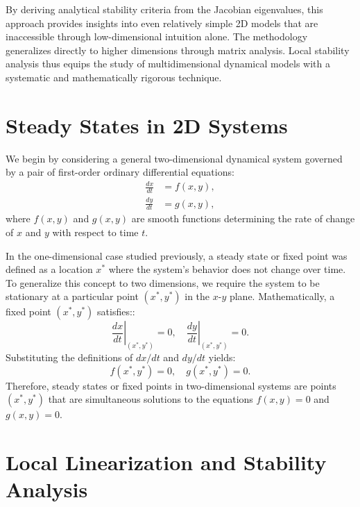 By deriving analytical stability criteria from the Jacobian eigenvalues, this approach provides insights into even relatively simple 2D models that are inaccessible through low-dimensional intuition alone. The methodology generalizes directly to higher dimensions through matrix analysis. Local stability analysis thus equips the study of multidimensional dynamical models with a systematic and mathematically rigorous technique.

\section{Steady States in 2D Systems}

We begin by considering a general two-dimensional dynamical system governed by a pair of first-order ordinary differential equations:
\begin{align}
\frac{dx}{dt} &= f(x,y), \label{eq:11.01}\\
\frac{dy}{dt} &= g(x,y), \label{eq:11.02}
\end{align}
where $f(x,y)$ and $g(x,y)$ are smooth functions determining the rate of change of $x$ and $y$ with respect to time $t$. 

In the one-dimensional case studied previously, a steady state or fixed point was defined as a location $x^*$ where the system's behavior does not change over time. To generalize this concept to two dimensions, we require the system to be stationary at a particular point $(x^*, y^*)$ in the $x$-$y$ plane. Mathematically, a fixed point $(x^*, y^*)$ satisfies::
\begin{equation*}
\left. \frac{dx}{dt}\right|_{(x^*,y^*)} = 0, \quad
\left. \frac{dy}{dt}\right|_{(x^*,y^*)} = 0.
\end{equation*}
Substituting the definitions of $dx/dt$ and $dy/dt$ yields:
\begin{equation*}
f(x^*,y^*) = 0, \quad
g(x^*,y^*) = 0.
\end{equation*}
Therefore, steady states or fixed points in two-dimensional systems are points $(x^*, y^*)$ that are simultaneous solutions to the equations $f(x,y)=0$ and $g(x,y)=0$.

\section{Local Linearization and Stability Analysis}

